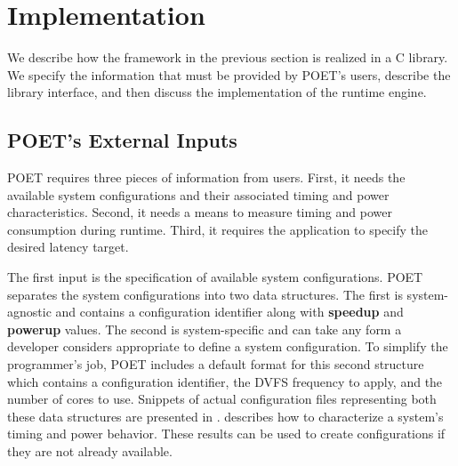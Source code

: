 \section{Implementation}
\label{sec:poet-implementation}

We describe how the framework in the previous section is realized in a C library.
We specify the information that must be provided by POET's users, describe the library interface, and then discuss the implementation of the runtime engine.

\subsection{POET's External Inputs}

POET requires three pieces of information from users.
First, it needs the available system configurations and their associated timing and power characteristics.
Second, it needs a means to measure timing and power consumption during runtime.
Third, it requires the application to specify the desired latency target.

The first input is the specification of available system configurations.
POET separates the system configurations into two data structures.
The first is system-agnostic and contains a configuration identifier along with \textbf{speedup} and \textbf{powerup} values.
The second is system-specific and can take any form a developer considers appropriate to define a system configuration.
To simplify the programmer's job, POET includes a default format for this second structure which contains a configuration identifier, the DVFS frequency to apply, and the number of cores to use.
Snippets of actual configuration files representing both these data structures are presented in .
 describes how to characterize a system's timing and power behavior.
These results can be used to create configurations if they are not already available.

